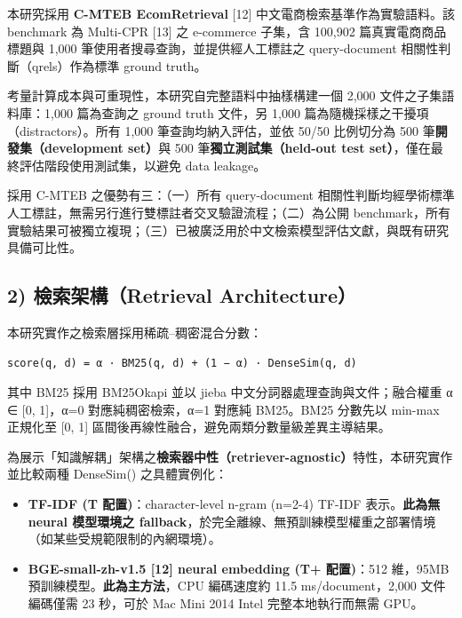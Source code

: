 本研究採用 \textbf{C-MTEB EcomRetrieval} {[}12{]} 中文電商檢索基準作為實驗語料。該
benchmark 為 Multi-CPR {[}13{]} 之 e-commerce 子集，含 100,902 篇真實電商商品標題與
1,000 筆使用者搜尋查詢，並提供經人工標註之 query-document 相關性判斷（qrels）作為標準
ground truth。

考量計算成本與可重現性，本研究自完整語料中抽樣構建一個 2,000 文件之子集語料庫：1,000
篇為查詢之 ground truth 文件，另 1,000 篇為隨機採樣之干擾項（distractors）。所有
1,000 筆查詢均納入評估，並依 50/50 比例切分為 500 筆\textbf{開發集（development
set）}與 500 筆\textbf{獨立測試集（held-out test set）}，僅在最終評估階段使用測試集，以避免
data leakage。

採用 C-MTEB 之優勢有三：（一）所有 query-document 相關性判斷均經學術標準人工標註，無需另行進行雙標註者交叉驗證流程；（二）為公開
benchmark，所有實驗結果可被獨立複現；（三）已被廣泛用於中文檢索模型評估文獻，與既有研究具備可比性。

\subsection{2) 檢索架構（Retrieval Architecture）}\label{ux6aa2ux7d22ux67b6ux69cb}

本研究實作之檢索層採用稀疏--稠密混合分數：

\begin{verbatim}
score(q, d) = α · BM25(q, d) + (1 − α) · DenseSim(q, d)
\end{verbatim}

其中 BM25 採用 BM25Okapi 並以 jieba 中文分詞器處理查詢與文件；融合權重
α ∈ {[}0, 1{]}，α=0 對應純稠密檢索，α=1 對應純 BM25。BM25 分數先以
min-max 正規化至 {[}0, 1{]} 區間後再線性融合，避免兩類分數量級差異主導結果。

為展示「知識解耦」架構之\textbf{檢索器中性（retriever-agnostic）}特性，本研究實作並比較兩種
DenseSim() 之具體實例化：

\begin{itemize}
\tightlist
\item
  \textbf{TF-IDF (T 配置)}：character-level n-gram (n=2-4) TF-IDF
  表示。\textbf{此為無 neural 模型環境之 fallback}，於完全離線、無預訓練模型權重之部署情境（如某些受規範限制的內網環境）。
\item
  \textbf{BGE-small-zh-v1.5 {[}12{]} neural embedding (T+ 配置)}：512 維，95MB 預訓練模型。\textbf{此為主方法}，CPU 編碼速度約
  11.5 ms/document，2,000 文件編碼僅需 23 秒，可於 Mac Mini 2014 Intel
  完整本地執行而無需 GPU。
\end{itemize}


